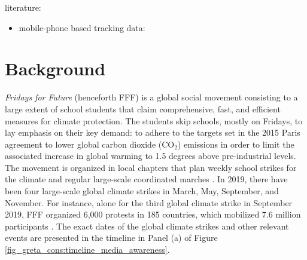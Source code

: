 literature: 
\begin{itemize}
	\item mobile-phone based tracking data: \cite{dave2020contagion}
\end{itemize}



\newpage
\section{Background}\label{sec_greta_cons:background}

\textit{Fridays for Future} (henceforth FFF) is a global social movement consisting to a large extent of school students that claim comprehensive, fast, and efficient measures for climate protection. The students skip schools, mostly on Fridays, to lay emphasis on their key demand: to adhere to the targets set in the 2015 Paris agreement to lower global carbon dioxide (CO$_2$) emissions in order to limit the associated increase in global warming to 1.5 degrees above pre-industrial levels. The movement is organized in local chapters that plan weekly school strikes for the climate and regular large-scale coordinated marches \citep{smith2019window}. In 2019, there have been four large-scale global climate strikes in March, May, September, and November. For instance, alone for the third global climate strike in September 2019, FFF organized 6,000 protests in 185 countries, which mobilized 7.6 million participants \citep{demoor2020protest}. The exact dates of the global climate strikes and other relevant events are presented in the timeline in Panel (a) of Figure \ref{fig_greta_cons:timeline_media_awareness}.


